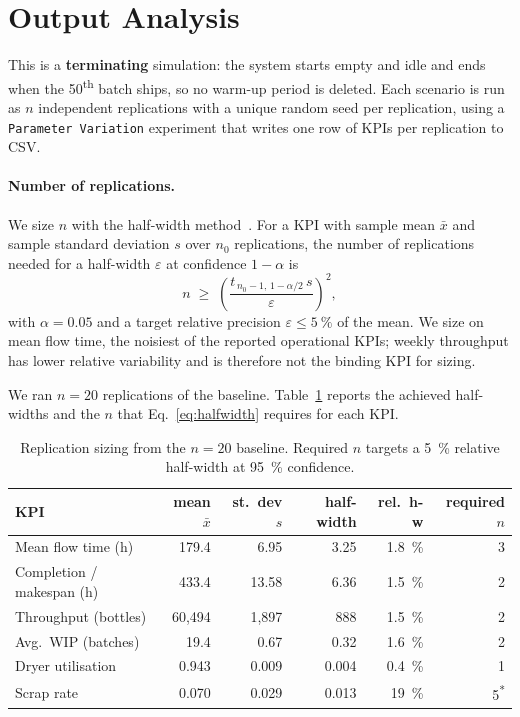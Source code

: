\section{Output Analysis}
\label{sec:output}

This is a \textbf{terminating} simulation: the system starts empty and idle and
ends when the 50\textsuperscript{th} batch ships, so no warm-up period is deleted.
Each scenario is run as $n$ independent replications with a unique random seed per
replication, using a \texttt{Parameter Variation} experiment that writes one row of
KPIs per replication to CSV.

\paragraph{Number of replications.}
We size $n$ with the half-width method~\cite{rossetti2016}. For a KPI with sample mean $\bar x$ and
sample standard deviation $s$ over $n_0$ replications, the number of replications
needed for a half-width $\varepsilon$ at confidence $1-\alpha$ is
\begin{equation}
  n \;\ge\; \left(\frac{t_{\,n_0-1,\,1-\alpha/2}\,s}{\varepsilon}\right)^{\!2},
  \label{eq:halfwidth}
\end{equation}
with $\alpha=0.05$ and a target relative precision $\varepsilon \le \SI{5}{\percent}$
of the mean. We size on mean flow time, the noisiest of the reported
operational KPIs; weekly throughput has lower relative variability and is therefore
not the binding KPI for sizing.

We ran $n=20$ replications of the baseline. Table~\ref{tab:reps} reports the achieved
half-widths and the $n$ that Eq.~\eqref{eq:halfwidth} requires for each KPI.

\begin{table}[H]
\centering
\caption{Replication sizing from the $n=20$ baseline. Required $n$ targets a
\SI{5}{\percent} relative half-width at \SI{95}{\percent} confidence.}
\label{tab:reps}
\begin{tabularx}{\textwidth}{X r r r r r}
\toprule
KPI & mean $\bar x$ & st.\ dev $s$ & half-width & rel.\ h-w & required $n$ \\
\midrule
Mean flow time (h)         & 179.4  & 6.95   & 3.25   & \SI{1.8}{\percent} & 3 \\
Completion / makespan (h)  & 433.4  & 13.58  & 6.36   & \SI{1.5}{\percent} & 2 \\
Throughput (bottles)       & 60{,}494 & 1{,}897 & 888 & \SI{1.5}{\percent} & 2 \\
Avg.\ WIP (batches)        & 19.4   & 0.67   & 0.32   & \SI{1.6}{\percent} & 2 \\
Dryer utilisation          & 0.943  & 0.009  & 0.004  & \SI{0.4}{\percent} & 1 \\
Scrap rate                 & 0.070  & 0.029  & 0.013  & \SI{19}{\percent}  & 5\textsuperscript{*} \\
\bottomrule
\end{tabularx}
\end{table}

